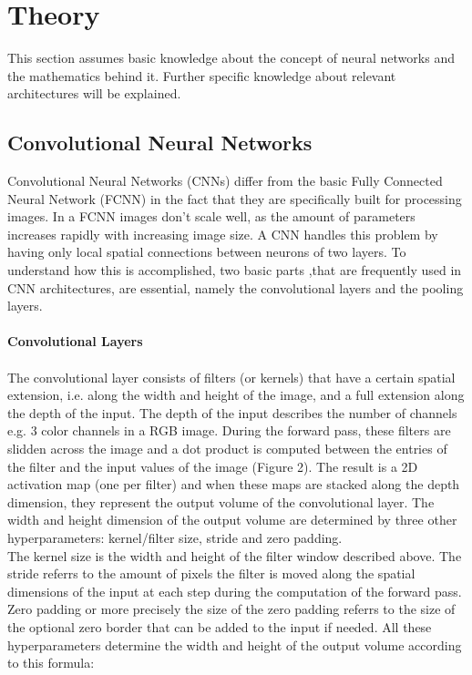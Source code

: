 \documentclass{article}
\begin{document}
\newpage
\section{Theory}
This section assumes basic knowledge about the concept of neural networks and the mathematics behind it. Further specific knowledge about relevant architectures will be explained.

\subsection{Convolutional Neural Networks}
Convolutional Neural Networks (CNNs) differ from the basic Fully Connected Neural Network (FCNN) in the fact that they are specifically built for processing images. In a FCNN images don't scale well, as the amount of parameters increases rapidly with increasing image size. A CNN handles this problem by having only local spatial connections between neurons of two layers. To understand how this is accomplished, two basic parts  ,that are frequently used in CNN architectures, are essential, namely the convolutional layers and the pooling layers.\\\\
\textbf{Convolutional Layers}\\\\
The convolutional layer consists of filters (or kernels) that have a certain spatial extension, i.e. along the width and height of the image, and a full extension along the depth of the input. The depth of the input describes the number of channels e.g. 3 color channels in a RGB image. During the forward pass, these filters are slidden across the image and a dot product is computed between the entries of the filter and the input values of the image (Figure 2). The result is a 2D activation map (one per filter) and when these maps are stacked along the depth dimension, they represent the output volume of the convolutional layer.
The width and height dimension of the output volume are determined by three other hyperparameters: kernel/filter size, stride and zero padding.\\
The kernel size is the width and height of the filter window described above. The stride referrs to the amount of pixels the filter is moved along the spatial dimensions of the input at each step during the computation of the forward pass. Zero padding or more precisely the size of the zero padding referrs to the size of the optional zero border that can be added to the input if needed. All these hyperparameters determine the width and height of the output volume according to this formula:
\end{document}
